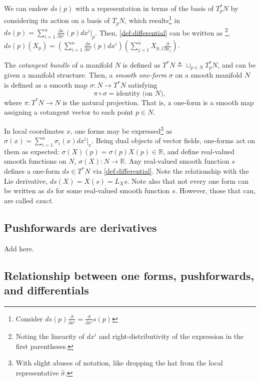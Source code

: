 \documentclass[psamsfonts]{amsart}
\theoremstyle{definition}
\theoremstyle{remark}
\newcommand*\R{\mathds{R}}
\newcommand*\isdefined{\triangleq}
\newcommand{\fracpartial}[2]{\frac{\partial #1}{\partial  #2}}
\numberwithin{equation}{section}
\begin{document}
We can endow $ds(p)$ with a representation in terms of the basis of $T^*_pN$ by considering its action on a basis of $T_pN$, which results\footnote{{\color{red}Consider $ds(p)\fracpartial{ }{x^i} = \fracpartial{}{x^i}s(p)$ }} in $ds(p) =\sum_{i = 1}^n \frac{\partial s}{\partial x^i}(p)dx^i\vert_p$. Then, \eqref{def:differential} can be written as \footnote{Noting the linearity of $dx^i$ and right-distributivity of the expression in the first parentheses.}, $ds(p)(X_p) = \left(\sum_{i = 1}^n \frac{\partial s}{\partial x^i}(p)dx^i  \right)\left(\sum_{j = 1}^nX_{p, j}\frac{\partial}{\partial x_j}\right)$. 

The \textit{cotangent bundle} of a manifold $N$ is defined as $T^*N \isdefined \cup_{p\in N}T_p^*N$, and can be given a manifold structure. Then, a \textit{smooth one-form} $\sigma$ on a smooth manifold $N$ is defined as a smooth map $\sigma : N \rightarrow T^*N$ satisfying $$\pi \circ \sigma = \text{identity (on } N),$$ where $\pi: T^*N \rightarrow N$ is the natural projection. That is, a one-form is a smooth map assigning a cotangent vector to each point $p\in N$.

In local coordinates $x$, one forms may be expressed\footnote{With slight abuses of notation, like dropping the hat from the local representative $\hat \sigma$.} as $\sigma(x) = \sum_{i=1}^n \sigma_i(x)dx^i\vert_{x}$. Being dual objects of vector fields, one-forms act on them as expected: $\sigma(X)(p) = \sigma(p)X(p) \in \R$, and define real-valued smooth functions on $N$, $\sigma(X) : N \rightarrow \R$. Any real-valued smooth function $s$ defines a one-form $ds\in T^*N$ via \eqref{def:differential}. Note the relationship with the Lie derivative, $ds(X) = X(s) = L_Xs$. Note also that not every one form can be written as $ds$ for some real-valued smooth function $s$. However, those that can, are called \textit{exact}. 

\subsection{Pushforwards are derivatives}
Add here. 
\subsection{Relationship between one forms, pushforwards, and differentials}
\end{document}
